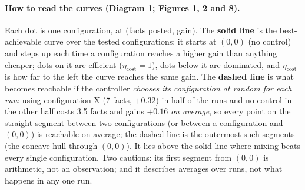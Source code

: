 \documentclass[10pt,a4paper]{article}
\begin{document}
\paragraph{How to read the curves (Diagram 1; Figures 1, 2 and 8).} Each dot is one configuration, at
(facts posted, gain). The \textbf{solid line} is the best-achievable curve over the tested configurations:
it starts at $(0,0)$ (no control) and steps up each time a configuration reaches a higher gain than
anything cheaper; dots on it are efficient ($\eta_{\text{cost}} = 1$), dots below it are dominated, and
$\eta_{\text{cost}}$ is how far to the left the curve reaches the same gain. The \textbf{dashed line} is
what becomes reachable if the controller \emph{chooses its configuration at random for each run}: using
configuration X (7 facts, $+0.32$) in half of the runs and no control in the other half costs 3.5 facts
and gains $+0.16$ \emph{on average}, so every point on the straight segment between two configurations
(or between a configuration and $(0,0)$) is reachable on average; the dashed line is the outermost such
segments (the concave hull through $(0,0)$). It lies above the solid line where mixing beats every single
configuration. Two cautions: its first segment from $(0,0)$ is arithmetic, not an observation; and it
describes averages over runs, not what happens in any one run.

\begin{center}
\par{}
\end{center}
\end{document}

